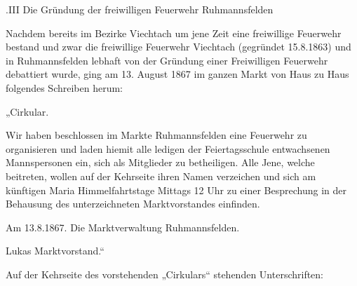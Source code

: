 \documentclass[12pt,a4paper]{book}
\begin{document}
.III Die Gründung der freiwilligen Feuerwehr Ruhmannsfelden

Nachdem bereits im Bezirke Viechtach um jene Zeit eine freiwillige Feuerwehr
bestand und zwar die freiwillige Feuerwehr Viechtach (gegründet 15.8.1863) und
in Ruhmannsfelden lebhaft von der Gründung einer Freiwilligen Feuerwehr
debattiert wurde, ging am 13. August 1867 im ganzen Markt von Haus zu Haus
folgendes Schreiben herum:

„Cirkular.

Wir haben beschlossen im Markte Ruhmannsfelden eine Feuerwehr zu organisieren
und laden hiemit alle ledigen der Feiertagsschule entwachsenen Mannspersonen
ein, sich als Mitglieder zu betheiligen. Alle Jene, welche beitreten, wollen auf
der Kehrseite ihren Namen verzeichen und sich am künftigen Maria
Himmelfahrtstage Mittags 12 Uhr zu einer Besprechung in der Behausung des
unterzeichneten Marktvorstandes einfinden.

Am 13.8.1867. Die Marktverwaltung Ruhmannsfelden.

Lukas Marktvorstand.“

Auf der Kehrseite des vorstehenden „Cirkulars“ stehenden Unterschriften:
\end{document}
